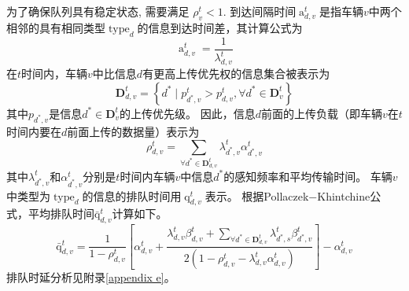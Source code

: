 为了确保队列具有稳定状态, 需要满足 $\rho_{v}^{t} < 1$.
到达间隔时间$\operatorname{a}_{d, v}^t$是指车辆$v$中两个相邻的具有相同类型$\operatorname{type}_d$的信息到达时间差，其计算公式为  
\begin{equation}
    \operatorname{a}_{d, v}^t=\frac{1}{\lambda_{d, v}^{t}}
\end{equation}
在$t$时间内，车辆$v$中比信息$d$有更高上传优先权的信息集合被表示为
\begin{equation}
\mathbf{D}_{d, v}^t=\left\{d^* \mid p_{d^*, v}^t>p_{d, v}^t, \forall d^* \in \mathbf{D}_v^t\right\} 
\end{equation}
其中$p_{d^*, v}$是信息$d^* \in \mathbf{D}_v^t$的上传优先级。
  因此，信息$d$前面的上传负载（即车辆$v$在$t$时间内要在$d$前面上传的数据量）表示为
\begin{equation}
\rho_{d, v}^t=\sum_{\forall d^* \in \mathbf{D}_{d, v}^t} \lambda_{d^*, v}^t \alpha_{d^*, v}^t
\end{equation}
其中$\lambda_{d^*, v}^t$和$\alpha_{d^*, v}^t$分别是$t$时间内车辆$v$中信息$d^*$的感知频率和平均传输时间。
车辆$v$中类型为$\operatorname{type}_d$的信息的排队时间用$\operatorname{q}_{d, v}^t$表示。
根据Pollaczek$-$Khintchine公式\cite{takine2001queue}，平均排队时间$\operatorname{\bar{q}}_{d, v}^t$计算如下。
\begin{equation}
    \operatorname{\bar{q}}_{d, v}^t= \frac{1} {1 - \rho_{d, v}^{t}} 
        \left[ \alpha_{d, v}^t + \frac{ \lambda_{d, v}^{t} \beta_{d, v}^t + \sum\limits_{\forall d^* \in \mathbf{D}_{d, v}^t} \lambda_{d^*,s}^t \beta_{d^*, v}^t }{2\left(1-\rho_{d, v}^{t} - \lambda_{d, v}^{t}  \alpha_{d, v}^t\right)}\right] 
        - \alpha_{d, v}^t
\label{equ 3-6}
\end{equation}
排队时延分析见附录\ref{appendix e}。

